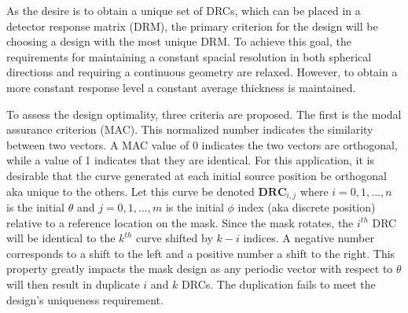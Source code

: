 \documentclass[3p,times]{elsarticle}
\begin{document}
As the desire is to obtain a unique set of DRCs, which can be placed in a detector response matrix (DRM), the primary criterion for the design will be choosing a design with the most
unique DRM.  To achieve this goal, the requirements for maintaining a constant spacial resolution in both spherical directions and requiring a continuous
geometry are relaxed.  However, to obtain a more constant response level a constant average thickness is maintained.  

To assess the design optimality, three criteria are proposed.  The first is the modal assurance criterion (MAC).  This normalized number indicates the similarity 
between two vectors\cite{Allemang03}.  A MAC value of 0 indicates the two vectors are orthogonal, while a value of 1 indicates that they are identical.  
For this application, it is desirable that the curve generated at each initial source position be orthogonal aka unique to the others.  Let this curve be denoted 
$\mathbf{DRC}_{i,j}$ where $i=0,1,...,n$ is the initial $\theta$ 
and $j=0,1,...,m$ is the initial $\phi$ index (aka discrete position) relative to a reference location on the mask.  Since the mask rotates, the $i^{th}$ DRC will be identical to the 
$k^{th}$ curve shifted by $k-i$ indices.  A negative number corresponds to a shift to the left and a positive number a shift to the right.  This property greatly impacts the mask design as
any periodic vector with respect to $\theta$ will then result in duplicate $i$ and $k$ DRCs.  The duplication fails to meet the design's uniqueness requirement.
\end{document}
